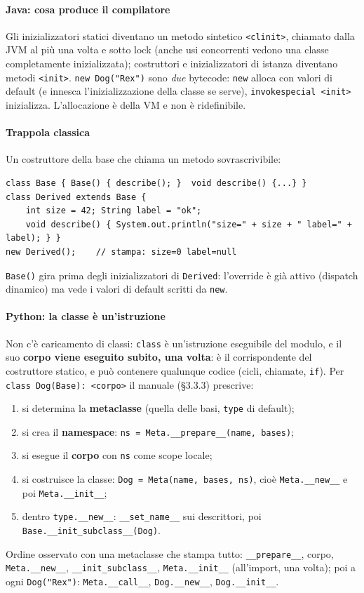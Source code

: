 \documentclass[a4paper,12pt]{article}
\begin{document}
\paragraph{Java: cosa produce il compilatore} Gli inizializzatori statici diventano un metodo
sintetico \texttt{<clinit>}, chiamato dalla JVM al più una volta e sotto lock (anche usi
concorrenti vedono una classe completamente inizializzata); costruttori e inizializzatori di
istanza diventano metodi \texttt{<init>}. \texttt{new Dog("Rex")} sono \emph{due} bytecode:
\texttt{new} alloca con valori di default (e innesca l'inizializzazione della classe se serve),
\texttt{invokespecial <init>} inizializza. L'allocazione è della VM e non è ridefinibile.

\paragraph{Trappola classica} Un costruttore della base che chiama un metodo sovrascrivibile:
\begin{verbatim}
class Base { Base() { describe(); }  void describe() {...} }
class Derived extends Base {
    int size = 42; String label = "ok";
    void describe() { System.out.println("size=" + size + " label=" + label); } }
new Derived();    // stampa: size=0 label=null
\end{verbatim}
\texttt{Base()} gira prima degli inizializzatori di \texttt{Derived}: l'override è già attivo
(dispatch dinamico) ma vede i valori di default scritti da \texttt{new}.

\paragraph{Python: la classe è un'istruzione} Non c'è caricamento di classi: \texttt{class} è
un'istruzione eseguibile del modulo, e il suo \textbf{corpo viene eseguito subito, una volta}:
è il corrispondente del costruttore statico, e può contenere qualunque codice (cicli,
chiamate, \texttt{if}). Per \texttt{class Dog(Base): <corpo>} il manuale (§3.3.3) prescrive:
\begin{enumerate}[nosep]
  \item si determina la \textbf{metaclasse} (quella delle basi, \texttt{type} di default);
  \item si crea il \textbf{namespace}: \texttt{ns = Meta.\_\_prepare\_\_(name, bases)};
  \item si esegue il \textbf{corpo} con \texttt{ns} come scope locale;
  \item si costruisce la classe: \texttt{Dog = Meta(name, bases, ns)}, cioè
        \texttt{Meta.\_\_new\_\_} e poi \texttt{Meta.\_\_init\_\_};
  \item dentro \texttt{type.\_\_new\_\_}: \texttt{\_\_set\_name\_\_} sui descrittori, poi
        \texttt{Base.\_\_init\_subclass\_\_(Dog)}.
\end{enumerate}
Ordine osservato con una metaclasse che stampa tutto: \texttt{\_\_prepare\_\_}, corpo,
\texttt{Meta.\_\_new\_\_}, \texttt{\_\_init\_subclass\_\_}, \texttt{Meta.\_\_init\_\_} (all'import,
una volta); poi a ogni \texttt{Dog("Rex")}: \texttt{Meta.\_\_call\_\_}, \texttt{Dog.\_\_new\_\_},
\texttt{Dog.\_\_init\_\_}.
\end{document}
